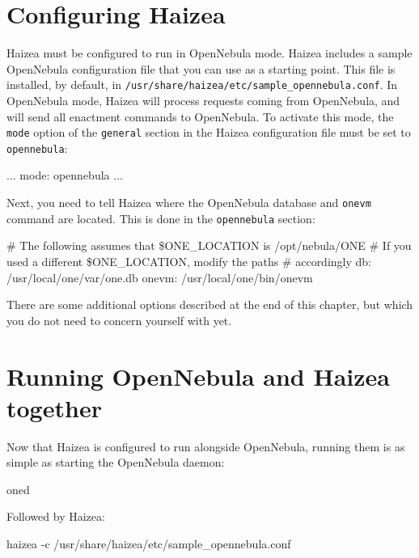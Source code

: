 \section{Configuring Haizea}

Haizea must be configured to run in OpenNebula mode. Haizea includes a sample OpenNebula configuration file that you can use as a starting point. This file is installed, by default, in \texttt{/usr/share/haizea/etc/sample\_opennebula.conf}. In OpenNebula mode, Haizea will process requests coming from OpenNebula, and will send all enactment commands to OpenNebula. To activate this mode, the \texttt{mode} option of the \texttt{general} section in the Haizea configuration file must be set to \texttt{opennebula}:

\begin{wideshellverbatim}
[general]
...
mode: opennebula
...
\end{wideshellverbatim}

Next, you need to tell Haizea where the OpenNebula database and \texttt{onevm} command are located. This is done in the \texttt{opennebula} section:

\begin{wideshellverbatim}
[opennebula]
# The following assumes that \$ONE_LOCATION is /opt/nebula/ONE
# If you used a different \$ONE_LOCATION, modify the paths 
# accordingly
db: /usr/local/one/var/one.db
onevm: /usr/local/one/bin/onevm
\end{wideshellverbatim}

There are some additional options described at the end of this chapter, but which you do not need to concern yourself with yet.

\section{Running OpenNebula and Haizea together}

Now that Haizea is configured to run alongside OpenNebula, running them is as simple as starting the OpenNebula daemon:

\begin{wideshellverbatim}
oned
\end{wideshellverbatim}

Followed by Haizea:

\begin{wideshellverbatim}
haizea -c /usr/share/haizea/etc/sample_opennebula.conf
\end{wideshellverbatim}

